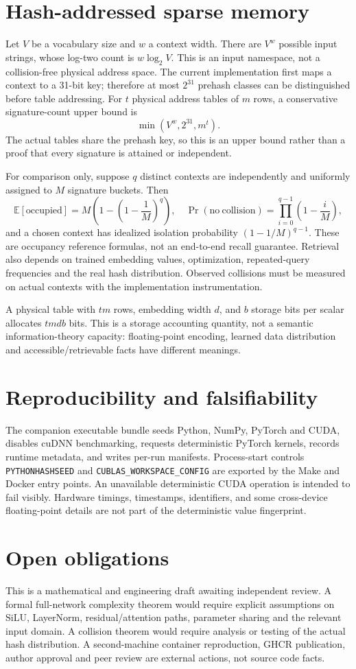 \documentclass[11pt]{article}
\begin{document}
\section{Hash-addressed sparse memory}
Let $V$ be a vocabulary size and $w$ a context width. There are $V^w$ possible
input strings, whose log-two count is $w\log_2 V$. This is an input namespace,
not a collision-free physical address space. The current implementation first
maps a context to a 31-bit key; therefore at most $2^{31}$ prehash classes can
be distinguished before table addressing. For $t$ physical address tables of
$m$ rows, a conservative signature-count upper bound is
\[
 \min(V^w,2^{31},m^t).
\]
The actual tables share the prehash key, so this is an upper bound rather than
a proof that every signature is attained or independent.

For comparison only, suppose $q$ distinct contexts are independently and
uniformly assigned to $M$ signature buckets. Then
\[
 \mathbb E[\mathrm{occupied}]=M\left(1-\left(1-\frac1M\right)^q\right),
 \quad
 \Pr(\mathrm{no\ collision})=\prod_{i=0}^{q-1}\left(1-\frac iM\right),
\]
and a chosen context has idealized isolation probability
$(1-1/M)^{q-1}$. These are occupancy reference formulas, not an end-to-end
recall guarantee. Retrieval also depends on trained embedding values,
optimization, repeated-query frequencies and the real hash distribution.
Observed collisions must be measured on actual contexts with the implementation
instrumentation.

A physical table with $tm$ rows, embedding width $d$, and $b$ storage bits per
scalar allocates $tmdb$ bits. This is a storage accounting quantity, not a
semantic information-theory capacity: floating-point encoding, learned data
distribution and accessible/retrievable facts have different meanings.

\section{Reproducibility and falsifiability}
The companion executable bundle seeds Python, NumPy, PyTorch and CUDA, disables
cuDNN benchmarking, requests deterministic PyTorch kernels, records runtime
metadata, and writes per-run manifests. Process-start controls
\texttt{PYTHONHASHSEED} and \texttt{CUBLAS\_WORKSPACE\_CONFIG} are exported by
the Make and Docker entry points. An unavailable deterministic CUDA operation
is intended to fail visibly. Hardware timings, timestamps, identifiers, and
some cross-device floating-point details are not part of the deterministic
value fingerprint.

\section{Open obligations}
This is a mathematical and engineering draft awaiting independent review. A
formal full-network complexity theorem would require explicit assumptions on
SiLU, LayerNorm, residual/attention paths, parameter sharing and the relevant
input domain. A collision theorem would require analysis or testing of the
actual hash distribution. A second-machine container reproduction, GHCR
publication, author approval and peer review are external actions, not source
code facts.
\end{document}
